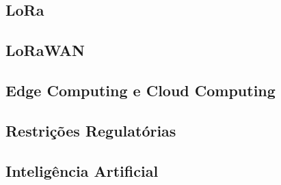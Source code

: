 \subsection{LoRa}


\subsection{LoRaWAN}


\subsection{Edge Computing e Cloud Computing}


\subsection{Restrições Regulatórias}


\subsection{Inteligência Artificial}
